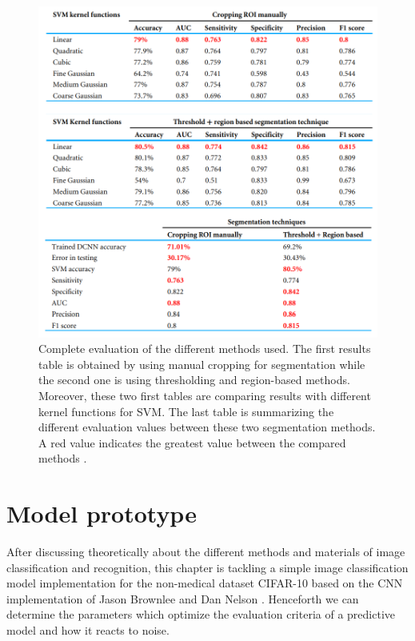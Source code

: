 \documentclass[11pt, openany]{report}
\theoremstyle{plain}
\theoremstyle{definition}
\theoremstyle{remark}
\begin{document}
\newpage
\hspace*{0mm}\vfill
\begin{figure}[H]
  \centering
  \includegraphics[scale=0.465]{figures/eval-article.png}
  \caption{Complete evaluation of the different methods used. The first results table is obtained by using manual cropping for segmentation while the second one is using thresholding and region-based methods. Moreover, these two first tables are comparing results with different kernel functions for SVM. The last table is summarizing the different evaluation values between these two segmentation methods. A red value indicates the greatest value between the compared methods \cite{breast-cancer}.}
  \label{fig:eval-article}
\end{figure}
\vfill\hspace*{0mm}


\chapter{Model prototype} \label{sec:CIFAR10-exp}

After discussing theoretically about the different methods and materials of image classification and recognition, this chapter is tackling a simple image classification model implementation for the non-medical dataset CIFAR-10 \cite{CIFAR10} based on the CNN implementation of Jason Brownlee \cite{CIFAR10-implementation-1} and Dan Nelson \cite{CIFAR10-implementation-2}. Henceforth we can determine the parameters which optimize the evaluation criteria of a predictive model and how it reacts to noise. 
\end{document}
